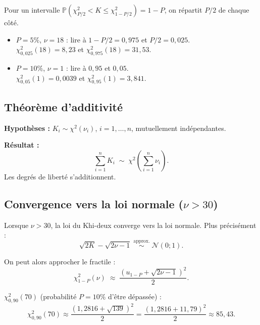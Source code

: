 \documentclass[11pt,a4paper]{article}
\newcommand{\N}{\mathcal{N}}
\newcommand{\Prob}{\mathbb{P}}
\renewcommand{\P}{\Prob}
\begin{document}
Pour un intervalle $\P\!\left(\chi^2_{P/2} < K \leq \chi^2_{1-P/2}\right) = 1-P$, on r\'epartit $P/2$ de chaque c\^ot\'e.

\begin{exbox}
\begin{itemize}
\item $P=5\%$, $\nu=18$ : lire \`a $1-P/2 = 0{,}975$ et $P/2 = 0{,}025$.\\
$\chi^2_{0{,}025}(18) = 8{,}23$ \quad et \quad $\chi^2_{0{,}975}(18) = 31{,}53$.
\item $P=10\%$, $\nu=1$ : lire \`a $0{,}95$ et $0{,}05$.\\
$\chi^2_{0{,}05}(1) = 0{,}0039$ \quad et \quad $\chi^2_{0{,}95}(1) = 3{,}841$.
\end{itemize}
\end{exbox}

\subsection{Th\'eor\`eme d'additivit\'e}

\begin{thmbox}
\textbf{Hypoth\`eses :} $K_i \sim \chi^2(\nu_i)$, $i=1,\ldots,n$, mutuellement ind\'ependantes.

\textbf{R\'esultat :}
$$\sum_{i=1}^{n} K_i \;\sim\; \chi^2\!\left(\sum_{i=1}^{n} \nu_i\right).$$
Les degr\'es de libert\'e s'additionnent.
\end{thmbox}

\subsection{Convergence vers la loi normale ($\nu > 30$)}

Lorsque $\nu > 30$, la loi du Khi-deux converge vers la loi normale. Plus pr\'ecis\'ement :
$$\sqrt{2K} - \sqrt{2\nu-1} \;\overset{\text{approx.}}{\sim}\; \N(0;1).$$

On peut alors approcher le fractile :
$$\chi^2_{1-P}(\nu) \;\approx\; \frac{\left(u_{1-P} + \sqrt{2\nu-1}\right)^2}{2}.$$

\begin{exbox}[Exemple]
$\chi^2_{0{,}90}(70)$ (probabilit\'e $P=10\%$ d'\^etre d\'epass\'ee) :
$$\chi^2_{0{,}90}(70) \approx \frac{(1{,}2816 + \sqrt{139})^2}{2} = \frac{(1{,}2816 + 11{,}79)^2}{2} \approx 85{,}43.$$
\end{exbox}

\newpage
\end{document}

